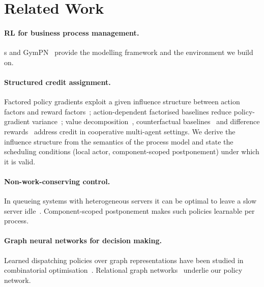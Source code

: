 \section{Related Work}\label{sec:related}

\paragraph{RL for business process management.}  \aepn{}s and
GymPN~\cite{aepn2023,aepn_repr2025,gympn2025} provide the modelling framework and the
environment we build on.

\paragraph{Structured credit assignment.} Factored policy gradients exploit a given
influence structure between action factors and reward factors~\cite{spooner2021fpg};
action-dependent factorised baselines reduce policy-gradient variance~\cite{wu2018adfb};
value decomposition~\cite{vdn2018}, counterfactual baselines~\cite{coma2018} and
difference rewards~\cite{difference2002} address credit in cooperative multi-agent
settings. We derive the influence structure from the semantics of the process model and
state the scheduling conditions (local actor, component-scoped postponement) under which
it is valid.

\paragraph{Non-work-conserving control.} In queueing systems with heterogeneous servers it
can be optimal to leave a slow server idle~\cite{linkumar1984}. Component-scoped
postponement makes such policies learnable per process. 

\paragraph{Graph neural networks for decision making.} Learned dispatching policies over
graph representations have been studied in combinatorial
optimisation~\cite{zhang2020jobshop}. Relational graph networks~\cite{rgcn2018,rgat2019,hu2020hgt}
underlie our policy network.
